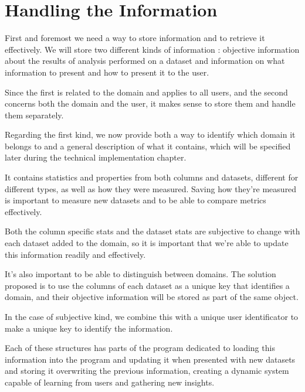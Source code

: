 \section{Handling the Information}
\label{cap2:sec:information}

First and foremost we need a way to store information and to retrieve it effectively. We will store two different kinds of information : objective information about the results of analysis performed on a dataset and information on what information to present and how to present it to the user.

Since the first is related to the domain and applies to all users, and the second concerns both the domain and the user, it makes sense to store them and handle them separately.

Regarding the first kind, we now provide both a way to identify which domain it belongs to and a general description of what it contains, which will be specified later during the technical implementation chapter.

It contains statistics and properties from both columns and datasets, different for different types, as well as how they were measured. Saving how they're measured is important to measure new datasets and to be able to compare metrics effectively.

Both the column specific stats and the dataset stats are subjective to change with each dataset added to the domain, so it is important that we're able to update this information readily and effectively.

It's also important to be able to distinguish between domains. The solution proposed is to use the columns of each dataset as a unique key that identifies a domain, and their objective information will be stored as part of the same object.

In the case of subjective kind, we combine this with a unique user identificator to make a unique key to identify the information.

Each of these structures has parts of the program dedicated to loading this information into the program and updating it when presented with new datasets and storing it overwriting the previous information, creating a dynamic system capable of learning from users and gathering new insights.

